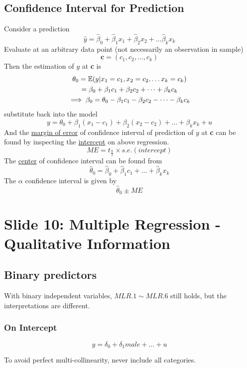 \documentclass[]{article}
\begin{document}
    	\subsection{Confidence Interval for Prediction}
    		\par Consider a prediction 
    		\[
    			\hat{y} = \hat{\beta}_0 + \hat{\beta}_1 x_1 + \hat{\beta}_2 x_2 + \dots \hat{\beta}_k x_k
    		\]
    		Evaluate at an arbitrary data point (not necessarily an observation in sample)
    		\[
    			\textbf{c} = (c_1, c_2, \dots ,c_k)
    		\]
    		Then the estimation of $y$ at \textbf{c} is 
    		\begin{gather*}
    			\theta_0 = \mathbb{E}({y|x_1=c_1, x_2=c_2, \dots x_k=c_k}) \\
    			= \beta_0 + \beta_1 c_1 + \beta_2 c_2 + \dots + \beta_k c_k \\
    			\implies \beta_0 = \theta_0 - \beta_1 c_1 - \beta_2 c_2 - \dots - \beta_k c_k
    		\end{gather*}
    		substitute back into the model
    		\[
    			y = \theta_0 + \beta_1 (x_1 - c_1) + \beta_2 (x_2 - c_2) + \dots + \beta_k x_k + u
    		\]
    		And the \ul{margin of error} of confidence interval of prediction of $y$ at \textbf{c} can be found by inspecting the \ul{intercept} on above regression.
    		\[
    			ME = t_{\frac{\alpha}{2}} \times s.e. (intercept)
    		\]
      		The \ul{center} of confidence interval can be found from 
    		\[
    			\hat{\theta}_0 = \hat{\beta}_0 + \hat{\beta}_1 c_1 + \dots + \hat{\beta}_k x_k
      		\]
      		The $\alpha$ confidence interval is given by
      		\[
      			\hat{\theta}_0 \pm ME
      		\]
      		
	\section{Slide 10: Multiple Regression - Qualitative Information}
		\subsection{Binary predictors}
			\begin{remark}
				With binary independent variables, $MLR.1 \sim MLR.6$ still holds, but the interpretations are different.
			\end{remark}
			
			\subsubsection{On Intercept}
			\[
				y = \delta_0 + \delta_1 male + \dots + u
			\]
			\begin{remark}
				To avoid perfect multi-collinearity, never include all categories.
			\end{remark}
			
\end{document}
